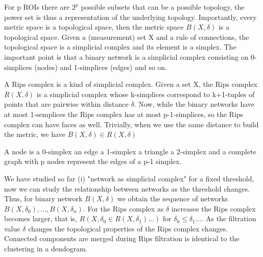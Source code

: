 \documentclass[onecollarge,runningheads]{svjour2}
\begin{document}
For p ROIs there are $2^p$ possible subsets that can be a possible topology, the power set is thus a representation of the underlying topology.
Importantly, every metric space is a topological space, then the metric space $B(X, \delta)$ is a topological space. 
Given a (measurement) set X and a rule of connections, the topological space is a simplicial complex and its element is a simplex. %
The important point is that a binary network is a simplicial complex consisting on 0-simplices (nodes) and 1-simplices (edges) and so on.

A Rips complex is a kind of simplicial complex. Given a set X, the Rips complex $R(X,\delta)$ is a simplicial complex whose k-simplices correspond to k+1-tuples of points that are pairwise within distance $\delta$. 
Now, while the binary networks have at most 1-semplices the Rips complex has at most p-1-simplices, so the Rips complex can have faces as well. Trivially, when we use the same distance to build the metric, we have $B(X,\delta) \in R(X,\delta)$

A node is a 0-simplex an edge a 1-simplex a triangle a 2-simplex and a complete graph with p nodes represent the edges of a p-1 simplex.

We have studied so far (i) "network as simplicial complex" for a fixed threshold, now we can study the relationship between networks as the threshold changes. Thus, for  binary network $B(X,\delta)$ we obtain the sequence of networks $B(X,\delta_0), ...,B(X,\delta_n)$. For the Rips complex as $\delta$ increases the Rips complex becomes larger, that is, $R(X,\delta_0 \in R(X,\delta_1) ...)$ for $\delta_0 \leq \delta_1 ...$. As the filtration value $\delta$ changes the topological properties of the Rips complex changes. Connected components are merged during Rips filtration is identical to the clustering in a dendogram.
\end{document}

